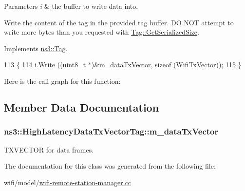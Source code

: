 \begin{DoxyParams}{Parameters}
{\em i} & the buffer to write data into.\\
\hline
\end{DoxyParams}
Write the content of the tag in the provided tag buffer. DO N\+OT attempt to write more bytes than you requested with \hyperlink{classns3_1_1Tag_a01c8efdea943fd8cce2ef5d4d67eefa6}{Tag\+::\+Get\+Serialized\+Size}. 

Implements \hyperlink{classns3_1_1Tag_ac9aa7c4f923da5d2c82de94690101dc3}{ns3\+::\+Tag}.


\begin{DoxyCode}
113 \{
114   \hyperlink{bernuolliDistribution_8m_a6f6ccfcf58b31cb6412107d9d5281426}{i}.Write ((uint8\_t *)&\hyperlink{classns3_1_1HighLatencyDataTxVectorTag_a3a0d5d34273f75f2004053db60492bc7}{m\_dataTxVector}, \textcolor{keyword}{sizeof} (WifiTxVector));
115 \}
\end{DoxyCode}


Here is the call graph for this function\+:




\subsection{Member Data Documentation}
\subsubsection[{\texorpdfstring{m\+\_\+data\+Tx\+Vector}{m_dataTxVector}}]{ ns3\+::\+High\+Latency\+Data\+Tx\+Vector\+Tag\+::m\+\_\+data\+Tx\+Vector\hspace{0.3cm}{\ttfamily [private]}}\hypertarget{classns3_1_1HighLatencyDataTxVectorTag_a3a0d5d34273f75f2004053db60492bc7}{}\label{classns3_1_1HighLatencyDataTxVectorTag_a3a0d5d34273f75f2004053db60492bc7}


T\+X\+V\+E\+C\+T\+OR for data frames. 



The documentation for this class was generated from the following file\+:\begin{DoxyCompactItemize}
\item 
wifi/model/\hyperlink{wifi-remote-station-manager_8cc}{wifi-\/remote-\/station-\/manager.\+cc}\end{DoxyCompactItemize}
